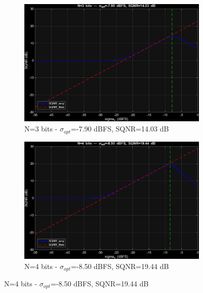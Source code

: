 \documentclass[11pt,a4paper]{article}
\begin{document}
\begin{figure}[H]
    \begin{subfigure}[t]{.4\textwidth}
        \centering
        \includegraphics[width=\linewidth]{img/task3_normal_n3.png}
        \caption{N=3 bits - $\sigma_{opt}$=-7.90 dBFS, SQNR=14.03 dB}
    \end{subfigure}
    \hfill
    \begin{subfigure}[t]{.4\textwidth}
        \centering
        \includegraphics[width=\linewidth]{img/task3_normal_n4.png}
        \caption{N=4 bits - $\sigma_{opt}$=-8.50 dBFS, SQNR=19.44 dB}
    \end{subfigure}

    \medskip


\end{figure}
\end{document}
